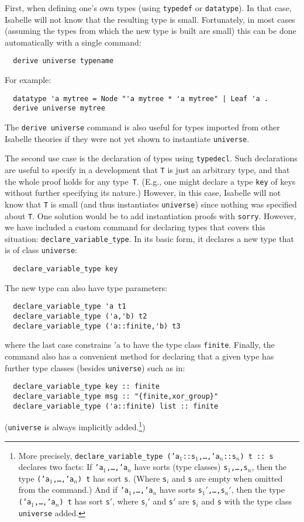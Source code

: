 \documentclass{article}
\begin{document}
First, when defining one's own types (using \texttt{typedef} or
\texttt{datatype}). In that case, Isabelle will not know that the
resulting type is small. Fortunately, in most cases
(assuming the types from which the new type is built are small) this
can be done automatically with a single command:
\begin{lstlisting}
  derive universe typename
\end{lstlisting}
For example:
\begin{lstlisting}
  datatype 'a mytree = Node "'a mytree * 'a mytree" | Leaf 'a .
  derive universe mytree
\end{lstlisting}
The \texttt{derive universe} command is also useful for types imported
from other Isabelle theories if they were not yet shown to instantiate
\texttt{universe}.


The second use case is the declaration of types using
\texttt{typedecl}. Such declarations are useful to specify in a
development that \texttt{T} is just an arbitrary type, and that the
whole proof holds for any type~\texttt{T}. (E.g., one might declare a
type \texttt{key} of keys without further specifying its nature.)
However, in this case, Isabelle will not know that \texttt{T} is
small (and thus instantiates \texttt{universe}) since
nothing was specified about \texttt{T}. One solution would be to add
instantiation proofs with \texttt{sorry}. However, we have included a
custom command for declaring types that covers this situation:
\texttt{declare\_variable\_type}. In its basic form, it declares a new
type that is of class \texttt{universe}:
\begin{lstlisting}
  declare_variable_type key
\end{lstlisting}
The new type can also have type parameters:
\begin{lstlisting}
  declare_variable_type 'a t1
  declare_variable_type ('a,'b) t2
  declare_variable_type ('a::finite,'b) t3
\end{lstlisting}
where the last case constrains 'a to have the type class
\texttt{finite}.  Finally, the command also has a convenient method
for declaring that a given type has further type classes (besides \texttt{universe}) such as in:
\begin{lstlisting}
  declare_variable_type key :: finite
  declare_variable_type msg :: "{finite,xor_group}"
  declare_variable_type ('a::finite) list :: finite
\end{lstlisting}
(\texttt{universe} is always implicitly added.\footnote{More precisely,
  \texttt{declare\_variable\_type\ ('a$_1$::s$_1$,\dots,'a$_n$::s$_n$) t :: s}
  declares two facts: If \texttt{'a$_1$,\dots,'a$_n$} have sorts (type classes)
  \texttt{s$_1$,\dots,s$_n$}, then the type \texttt{('a$_1$,\dots,'a$_n$) t}
  has sort \texttt{s}. (Where \texttt{s$_i$} and \texttt{s} are empty when omitted from the command.)
  And
  if \texttt{'a$_1$,\dots,'a$_n$} have sorts
  \texttt{s$_1'$,\dots,s$_n'$}, then the type \texttt{('a$_1$,\dots,'a$_n$) t}
  has sort \texttt{s$'$}, where \texttt{s$_i'$} and \texttt{s$'$} are
  \texttt{s$_i$} and \texttt{s} with the type class \texttt{universe} added.})
\end{document}

